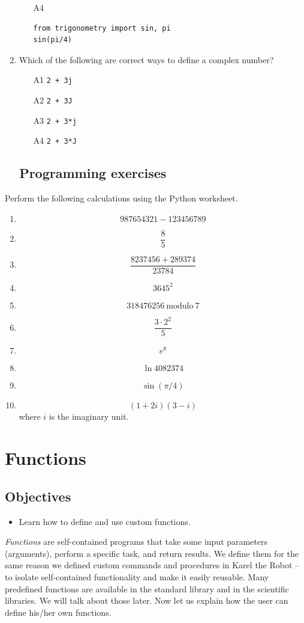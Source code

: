 \begin{enumerate}
\begin{enumerate}
\item[A4] 
\begin{verbatim}
from trigonometry import sin, pi
sin(pi/4)
\end{verbatim}
\end{enumerate}
\item Which of the following are correct ways to define a complex number?
\begin{enumerate}
\item[A1] {\tt 2 + 3j}
\item[A2] {\tt 2 + 3J}
\item[A3] {\tt 2 + 3*j}
\item[A4] {\tt 2 + 3*J}
\end{enumerate}
\end{enumerate}

\subsection{\ \ Programming exercises}
Perform the following calculations using the Python worksheet.
\begin{enumerate}
\item 
$$
  987654321 - 123456789
$$
\item 
$$
\frac{8}{5}
$$
\item 
$$
  \frac{8237456 + 289374}{23784}
$$ 
\item 
$$
  3645^2
$$
\item 
$$
  318476256 \ \mbox{modulo} \ 7
$$
\item 
$$
  \frac{3\cdot 2^2}{5} 
$$
\item 
$$
  e^8
$$
\item 
$$
  \ln 4082374
$$
\item 
$$
  \sin(\pi / 4)
$$
\item 
$$
  (1 + 2i)(3 - i)
$$
where $i$ is the imaginary unit.
\end{enumerate}

\section{Functions}

\subsection{Objectives}

\begin{itemize}
\item Learn how to define and use custom functions.
\end{itemize}
{\em Functions} are self-contained programs that take some input parameters (arguments), 
perform a specific task,
and return results. We define them for the same reason we defined custom commands and procedures 
in Karel the Robot -- to isolate self-contained functionality and make it easily reusable.
Many predefined functions are available in the standard library and in the scientific libraries. 
We will talk about those later. Now let us explain how the user can define his/her own functions.

